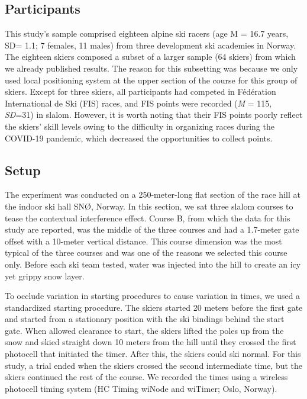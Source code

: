\documentclass{article}
\begin{document}
\subsection*{Participants}
This study's sample comprised eighteen alpine ski racers (age M = 16.7 years, SD= 1.1; 7 females, 11 males) from three development ski academies in Norway. The eighteen skiers composed a subset of a larger sample (64 skiers) from which we already published results. The reason for this subsetting was because we only used local positioning system at the upper section of the course for this group of skiers. Except for three skiers, all participants had competed in Fédération International de Ski (FIS) races, and FIS points were recorded (\textit{M} = 115, \textit{SD}=31) in slalom. However, it is worth noting that their FIS points poorly reflect the skiers' skill levels owing to the difficulty in organizing races during the COVID-19 pandemic, which decreased the opportunities to collect points.  

\subsection{Setup}

The experiment was conducted on a 250-meter-long flat section of the race hill at the indoor ski hall SNØ, Norway. In this section, we sat three slalom courses to tease the contextual interference effect. Course B, from which the data for this study are reported, was the middle of the three courses and had a 1.7-meter gate offset with a 10-meter vertical distance. This course dimension was the most typical of the three courses and was one of the reasons we selected this course only. Before each ski team tested, water was injected into the hill to create an icy yet grippy snow layer.

To occlude variation in starting procedures to cause variation in times, we used a standardized starting procedure. The skiers started 20 meters before the first gate and started from a stationary position with the ski bindings behind the start gate. When allowed clearance to start, the skiers lifted the poles up from the snow and skied straight down 10 meters from the hill until they crossed the first photocell that initiated the timer. After this, the skiers could ski normal. For this study, a trial ended when the skiers crossed the second intermediate time, but the skiers continued the rest of the course. We recorded the times using a wireless photocell timing system (HC Timing wiNode and wiTimer; Oslo, Norway).
\end{document}
